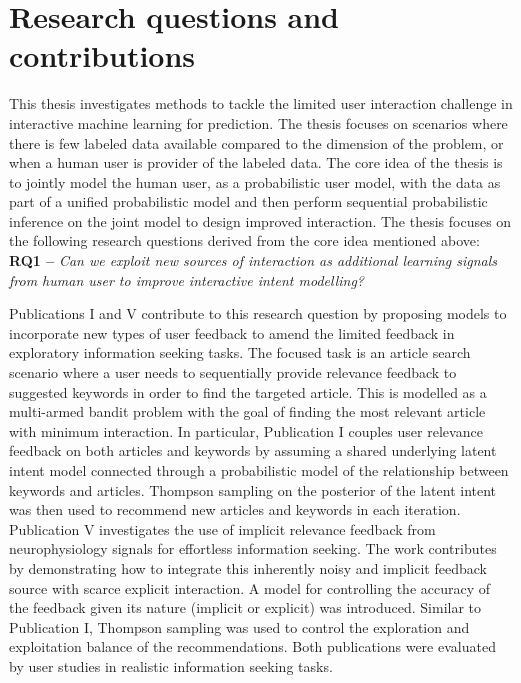 \documentclass[dissertation,math,vertlayout,pdfa,colorlinks]{aaltoseries}
\begin{document}
 
\section{Research questions and contributions}


This thesis investigates methods to tackle the limited user interaction challenge in interactive machine learning for prediction. The thesis focuses on scenarios where there is few labeled data available compared to the dimension of the problem, or when a human user is provider of the labeled data. The core idea of the thesis is to jointly model the human user, as a probabilistic user model, with the data as part of a unified probabilistic model and then perform sequential probabilistic inference on the joint model to design improved interaction.  The thesis focuses on the following research questions derived from the core idea mentioned above:\\

\noindent \textbf{RQ1 --} \textit{Can we exploit new sources of interaction as additional learning signals from human user to improve interactive intent modelling?}

Publications I and V contribute to this research question by proposing models to incorporate new types of user feedback to amend the limited feedback in exploratory information seeking tasks. The focused task is an article search scenario where a user needs to sequentially provide relevance feedback to suggested keywords in order to find the targeted article. This is modelled as a multi-armed bandit problem with the goal of finding the most relevant article with minimum interaction. In particular, Publication I couples user relevance feedback on both articles and keywords by assuming a shared underlying latent intent model connected through a probabilistic model of the relationship between keywords and articles. Thompson sampling on the posterior of the latent intent was then used to recommend new articles and keywords in each iteration. Publication V investigates the use of implicit relevance feedback from neurophysiology signals for effortless information seeking. The work contributes by demonstrating how to integrate this inherently noisy and implicit feedback source with scarce explicit interaction. A model for controlling the accuracy of the feedback given its nature (implicit or explicit) was introduced. Similar to Publication I, Thompson sampling was used to control the exploration and exploitation balance of the recommendations. Both publications were evaluated by user studies in realistic information seeking tasks. 
\end{document}
